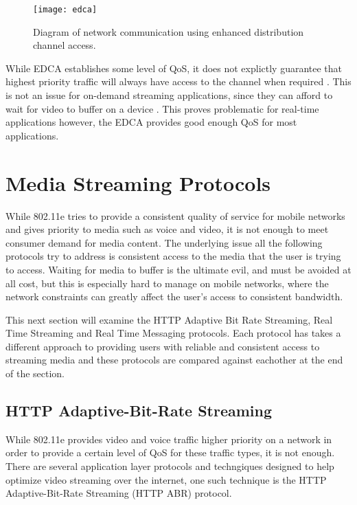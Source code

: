 \documentclass[12pt]{article}
\begin{document}
\begin{figure}[h]
  \begin{center}
    \texttt{[image: edca]}
    \caption{Diagram of network communication using enhanced distribution channel access.}
    \label{fig:edca}
  \end{center}
\end{figure}

While EDCA establishes some level of QoS, it does not explictly guarantee that highest priority traffic will always have access to the channel when required \cite{Thottan:2006:IEM:1234161.1234187}.  This is not an issue for on-demand streaming applications, since they can afford to wait for video to buffer on a device \cite{ciscoqos}.  This proves problematic for real-time applications \cite{5336865} however, the EDCA provides good enough QoS for most applications.

\section{Media Streaming Protocols}
While 802.11e tries to provide a consistent quality of service for mobile networks and gives priority to media such as voice and video, it is not enough to meet consumer demand for media content.  The underlying issue all the following protocols try to address is consistent access to the media that the user is trying to access.  Waiting for media to buffer is the ultimate evil, and must be avoided at all cost, but this is especially hard to manage on mobile networks, where the network constraints can greatly affect the user's access to consistent bandwidth.

This next section will examine the HTTP Adaptive Bit Rate Streaming, Real Time Streaming and Real Time Messaging protocols.  Each protocol has takes a different approach to providing users with reliable and consistent access to streaming media and these protocols are compared against eachother at the end of the section.

\subsection{HTTP Adaptive-Bit-Rate Streaming}
While 802.11e provides video and voice traffic higher priority on a network in order to provide a certain level of QoS for these traffic types, it is not enough.  There are several application layer protocols and techngiques designed to help optimize video streaming over the internet, one such technique is the HTTP Adaptive-Bit-Rate Streaming (HTTP ABR) protocol.
\end{document}
